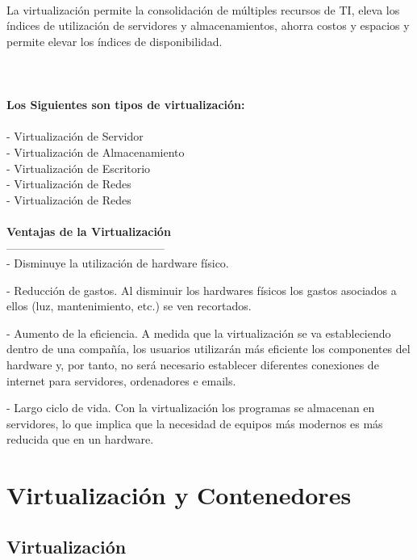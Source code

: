 \documentclass[twoside,twocolumn]{article}
\begin{document}
\begin{flushright}
\begin{itemize}
\textbf{}\\
La virtualización permite la consolidación de múltiples recursos de TI, 
eleva los índices de utilización de servidores y almacenamientos,
ahorra costos y espacios y permite elevar los índices de disponibilidad. 
\textbf{}\\
\textbf{}\\
\textbf{}\\
\textbf{}\\
\textbf{Los Siguientes son tipos de virtualización:}\\

\textbf{}\\
- Virtualización de Servidor
\textbf{}\\
- Virtualización de Almacenamiento
\textbf{}\\
- Virtualización de Escritorio
\textbf{}\\
- Virtualización de Redes
\textbf{}\\
- Virtualización de Redes
\textbf{}\\
\textbf{}\\
\textbf{Ventajas de la Virtualización}\\
------------------------------------------
\textbf{}\\
- Disminuye la utilización de hardware físico.

- Reducción de gastos. Al disminuir los hardwares físicos los gastos asociados a ellos (luz, mantenimiento, etc.) se ven recortados.

- Aumento de la eficiencia. A medida que la virtualización se va estableciendo dentro de una compañía, los usuarios utilizarán más eficiente los componentes del hardware y, por tanto, no será necesario establecer diferentes conexiones de internet para servidores, ordenadores e emails.

- Largo ciclo de vida. Con la virtualización los programas se almacenan en servidores, lo que implica que la necesidad de equipos más modernos es más reducida que en un hardware.











\section{Virtualización y Contenedores}


\subsection{Virtualización}



\end{itemize}
\end{flushright}
\end{document}
